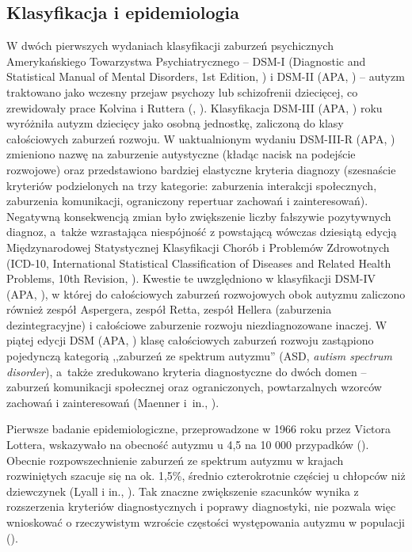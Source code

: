     \subsection{Klasyfikacja i epidemiologia}
    W dwóch pierwszych wydaniach klasyfikacji zaburzeń psychicznych Amerykańskiego Towarzystwa Psychiatrycznego -- DSM-I (Diagnostic and Statistical Manual of Mental Disorders, 1st Edition, \cite{dsm1}) i DSM-II (APA, \cite*{dsm2}) -- autyzm traktowano jako wczesny przejaw psychozy lub schizofrenii dziecięcej, co zrewidowały prace Kolvina i Ruttera (\cite{kolvin1972infantile}, \cite{rutter1972childhood}).
    Klasyfikacja DSM-III (APA, \cite*{dsm3}) roku wyróżniła autyzm dziecięcy jako osobną jednostkę, zaliczoną do klasy całościowych zaburzeń rozwoju.
    W uaktualnionym wydaniu DSM-III-R (APA, \cite*{dsm3r}) zmieniono nazwę na zaburzenie autystyczne (kładąc nacisk na podejście rozwojowe) oraz przedstawiono bardziej elastyczne kryteria diagnozy (szesnaście kryteriów podzielonych na trzy kategorie: zaburzenia interakcji społecznych, zaburzenia komunikacji, ograniczony repertuar zachowań i zainteresowań).
    Negatywną konsekwencją zmian było zwiększenie liczby fałszywie pozytywnych diagnoz, a~także wzrastająca niespójność z powstającą wówczas dziesiątą edycją Międzynarodowej Statystycznej Klasyfikacji Chorób i Problemów Zdrowotnych (ICD-10, International Statistical Classification of Diseases and Related Health Problems, 10th Revision, \cite{icd10}).
    Kwestie te uwzględniono w klasyfikacji DSM-IV (APA, \cite*{dsm4}), w której do całościowych zaburzeń rozwojowych obok autyzmu zaliczono również zespół Aspergera, zespół Retta, zespół Hellera (zaburzenia dezintegracyjne) i całościowe zaburzenie rozwoju niezdiagnozowane inaczej.
    W piątej edycji DSM (APA, \cite*{dsm5}) klasę  całościowych zaburzeń rozwoju zastąpiono pojedynczą kategorią ,,zaburzeń ze spektrum autyzmu'' (ASD, \emph{autism spectrum disorder}), a~także zredukowano kryteria diagnostyczne do dwóch domen -- zaburzeń komunikacji społecznej oraz ograniczonych, powtarzalnych wzorców zachowań i zainteresowań (Maenner i~in., \cite*{maenner2014potential}).
    
    Pierwsze badanie epidemiologiczne, przeprowadzone w 1966 roku przez Victora Lottera, wskazywało na obecność autyzmu u 4,5 na 10 000 przypadków (\cite{lotter1966epidemiology}).
    Obecnie rozpowszechnienie zaburzeń ze spektrum autyzmu w krajach rozwiniętych szacuje się na ok. 1,5\%, średnio czterokrotnie częściej u chłopców niż dziewczynek (Lyall i in., \cite*{lyall2017changing}).
    Tak znaczne zwiększenie szacunków wynika z rozszerzenia kryteriów diagnostycznych i poprawy diagnostyki, nie pozwala więc wnioskować o rzeczywistym wzroście częstości występowania autyzmu w populacji (\cite{frith2008autyzm}).  
    
